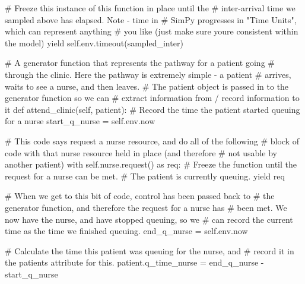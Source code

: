 \documentclass[
  letterpaper,
  DIV=11,
  numbers=noendperiod]{scrreprt}
\newenvironment{Shaded}{\begin{snugshade}}{\end{snugshade}}
\newcommand{\CommentTok}[1]{\textcolor[rgb]{0.37,0.37,0.37}{#1}}
\newcommand{\ControlFlowTok}[1]{\textcolor[rgb]{0.00,0.23,0.31}{#1}}
\newcommand{\ImportTok}[1]{\textcolor[rgb]{0.00,0.46,0.62}{#1}}
\newcommand{\KeywordTok}[1]{\textcolor[rgb]{0.00,0.23,0.31}{#1}}
\newcommand{\NormalTok}[1]{\textcolor[rgb]{0.00,0.23,0.31}{#1}}
\newcommand{\OperatorTok}[1]{\textcolor[rgb]{0.37,0.37,0.37}{#1}}
\newcommand{\VariableTok}[1]{\textcolor[rgb]{0.07,0.07,0.07}{#1}}
\begin{document}
\begin{tcolorbox}
\begin{Shaded}
\begin{Highlighting}[]
            \CommentTok{\# Freeze this instance of this function in place until the}
            \CommentTok{\# inter{-}arrival time we sampled above has elapsed.  Note {-} time in}
            \CommentTok{\# SimPy progresses in "Time Units", which can represent anything}
            \CommentTok{\# you like (just make sure you\textquotesingle{}re consistent within the model)}
            \ControlFlowTok{yield} \VariableTok{self}\NormalTok{.env.timeout(sampled\_inter)}

    \CommentTok{\# A generator function that represents the pathway for a patient going}
    \CommentTok{\# through the clinic.  Here the pathway is extremely simple {-} a patient}
    \CommentTok{\# arrives, waits to see a nurse, and then leaves.}
    \CommentTok{\# The patient object is passed in to the generator function so we can}
    \CommentTok{\# extract information from / record information to it}
    \KeywordTok{def}\NormalTok{ attend\_clinic(}\VariableTok{self}\NormalTok{, patient):}
        \CommentTok{\# Record the time the patient started queuing for a nurse}
\NormalTok{        start\_q\_nurse }\OperatorTok{=} \VariableTok{self}\NormalTok{.env.now}

        \CommentTok{\# This code says request a nurse resource, and do all of the following}
        \CommentTok{\# block of code with that nurse resource held in place (and therefore}
        \CommentTok{\# not usable by another patient)}
        \ControlFlowTok{with} \VariableTok{self}\NormalTok{.nurse.request() }\ImportTok{as}\NormalTok{ req:}
            \CommentTok{\# Freeze the function until the request for a nurse can be met.}
            \CommentTok{\# The patient is currently queuing.}
            \ControlFlowTok{yield}\NormalTok{ req}

            \CommentTok{\# When we get to this bit of code, control has been passed back to}
            \CommentTok{\# the generator function, and therefore the request for a nurse has}
            \CommentTok{\# been met.  We now have the nurse, and have stopped queuing, so we}
            \CommentTok{\# can record the current time as the time we finished queuing.}
\NormalTok{            end\_q\_nurse }\OperatorTok{=} \VariableTok{self}\NormalTok{.env.now}

            \CommentTok{\# Calculate the time this patient was queuing for the nurse, and}
            \CommentTok{\# record it in the patient\textquotesingle{}s attribute for this.}
\NormalTok{            patient.q\_time\_nurse }\OperatorTok{=}\NormalTok{ end\_q\_nurse }\OperatorTok{{-}}\NormalTok{ start\_q\_nurse}


\end{Highlighting}
\end{Shaded}
\end{tcolorbox}
\end{document}
